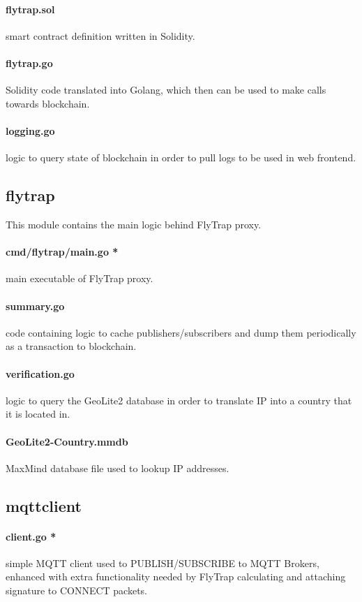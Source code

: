 \paragraph{flytrap.sol} smart contract definition written in Solidity.
\paragraph{flytrap.go} Solidity code translated into Golang, which then can be used to make calls towards blockchain.
\paragraph{logging.go} logic to query state of blockchain in order to pull logs to be used in web frontend.
\subsection{flytrap}
This module contains the main logic behind FlyTrap proxy. 
\paragraph{cmd/flytrap/main.go *} main executable of FlyTrap proxy.
\paragraph{summary.go} code containing logic to cache publishers/subscribers and dump them periodically as a transaction to blockchain.
\paragraph{verification.go} logic to query the GeoLite2 database in order to translate IP into a country that it is located in.
\paragraph{GeoLite2-Country.mmdb} MaxMind database file used to lookup IP addresses.
\subsection{mqttclient}
\paragraph{client.go *} simple MQTT client used to PUBLISH/SUBSCRIBE to MQTT Brokers, enhanced with extra functionality needed by FlyTrap calculating and attaching signature to CONNECT packets.
